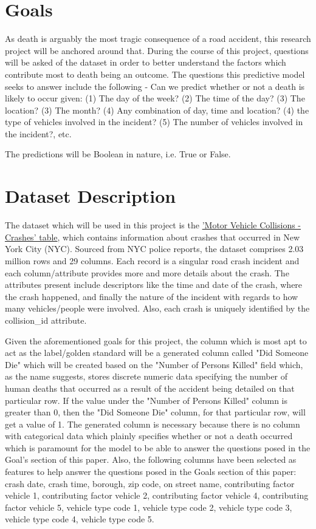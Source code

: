 \documentclass[12pt, a4paper]{article}
\begin{document}
\section*{Goals} As death is arguably the most tragic consequence of a road accident, this research project will be anchored around that. During the course of this project, questions will be asked of the dataset in order to better understand the factors which contribute most to death being an outcome. The questions this predictive model seeks to answer include the following - Can we predict whether or not a death is likely to occur given: (1) The day of the week? (2) The time of the day? (3) The location? (3) The month? (4) Any combination of day, time and location? (4) the type of vehicles involved in the incident? (5) The number of vehicles involved in the incident?, etc. 

The predictions will be Boolean in nature, i.e. True or False.


\section*{Dataset Description}
The dataset which will be used in this project is the \href{https://data.cityofnewyork.us/Public-Safety/Motor-Vehicle-Collisions-Crashes/h9gi-nx95}{'Motor Vehicle Collisions - Crashes' table}, which contains information about crashes that occurred in New York City (NYC). Sourced from NYC police reports, the dataset comprises 2.03 million rows and 29 columns. Each record is a singular road crash incident and each column/attribute provides more and more details about the crash. The attributes present include descriptors like the time and date of the crash, where the crash happened, and finally the nature of the incident with regards to how many vehicles/people were involved. Also, each crash is uniquely identified by the collision\_id attribute. 

Given the aforementioned goals for this project, the column which is most apt to act as the label/golden standard will be a generated column called "Did Someone Die" which will be created based on the "Number of Persons Killed" field which, as the name suggests, stores discrete numeric data specifying the number of human deaths that occurred as a result of the accident being detailed on that particular row. If the value under the "Number of Persons Killed" column is greater than 0, then the "Did Someone Die" column, for that particular row, will get a value of 1. The generated column is necessary because there is no column with categorical data which plainly specifies whether or not a death occurred which is paramount for the model to be able to answer the questions posed in the Goal's section of this paper. Also, the following columns have been selected as features to help answer the questions posed in the Goals section of this paper: crash date, crash time, borough, zip code, on street name, contributing factor vehicle 1, contributing factor vehicle 2, contributing factor vehicle 4, contributing factor vehicle 5, vehicle type code 1, vehicle type code 2, vehicle type code 3, vehicle type code 4, vehicle type code 5.
\end{document}
